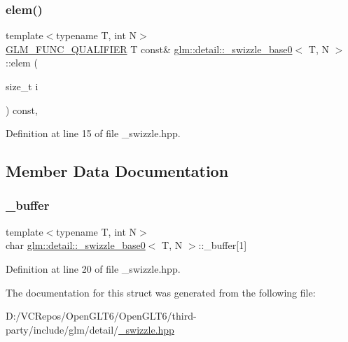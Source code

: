 \subsubsection{\texorpdfstring{elem()}{elem()}\hspace{0.1cm}{\footnotesize\ttfamily [2/2]}}
{\footnotesize\ttfamily template$<$typename T, int N$>$ \\
\mbox{\hyperlink{setup_8hpp_a33fdea6f91c5f834105f7415e2a64407}{G\+L\+M\+\_\+\+F\+U\+N\+C\+\_\+\+Q\+U\+A\+L\+I\+F\+I\+ER}} T const\& \mbox{\hyperlink{structglm_1_1detail_1_1__swizzle__base0}{glm\+::detail\+::\+\_\+swizzle\+\_\+base0}}$<$ T, N $>$\+::elem (\begin{DoxyParamCaption}\item[{size\+\_\+t}]{i }\end{DoxyParamCaption}) const\hspace{0.3cm}{\ttfamily [inline]}, {\ttfamily [protected]}}



Definition at line 15 of file \+\_\+swizzle.\+hpp.



\subsection{Member Data Documentation}
\mbox{\label{structglm_1_1detail_1_1__swizzle__base0_afd4b7f15c9acff4cdef808f559ffec2d}} 
\subsubsection{\texorpdfstring{\_buffer}{\_buffer}}
{\footnotesize\ttfamily template$<$typename T, int N$>$ \\
char \mbox{\hyperlink{structglm_1_1detail_1_1__swizzle__base0}{glm\+::detail\+::\+\_\+swizzle\+\_\+base0}}$<$ T, N $>$\+::\+\_\+buffer\mbox{[}1\mbox{]}\hspace{0.3cm}{\ttfamily [protected]}}



Definition at line 20 of file \+\_\+swizzle.\+hpp.



The documentation for this struct was generated from the following file\+:\begin{DoxyCompactItemize}
\item 
D\+:/\+V\+C\+Repos/\+Open\+G\+L\+T6/\+Open\+G\+L\+T6/third-\/party/include/glm/detail/\mbox{\hyperlink{__swizzle_8hpp}{\+\_\+swizzle.\+hpp}}\end{DoxyCompactItemize}
